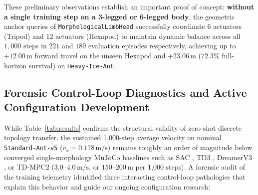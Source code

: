 \documentclass[11pt,a4paper]{article}
\begin{document}
These preliminary observations establish an important proof of concept: \textbf{without a single training step on a 3-legged or 6-legged body}, the geometric anchor queries of \texttt{MorphologicalLimbHead} successfully coordinate $6$ actuators (Tripod) and $12$ actuators (Hexapod) to maintain dynamic balance across all $1,000$ steps in $221$ and $189$ evaluation episodes respectively, achieving up to $+12.00\,\text{m}$ forward travel on the unseen Hexapod and $+23.06\,\text{m}$ ($72.3\%$ full-horizon survival) on \texttt{Heavy-Ice-Ant}.

\subsection{Forensic Control-Loop Diagnostics and Active Configuration Development}
While Table~\ref{tab:results} confirms the structural validity of zero-shot discrete topology transfer, the sustained 1,000-step average velocity on nominal \texttt{Standard-Ant-v5} ($\bar{v}_x = 0.178\,\text{m/s}$) remains roughly an order of magnitude below converged single-morphology MuJoCo baselines such as SAC \cite{haarnoja2018soft}, TD3 \cite{fujimoto2018addressing}, DreamerV3 \cite{hafner2023mastering}, or TD-MPC2 \cite{hansen2024tdmpc2} ($3.0\text{--}4.0\,\text{m/s}$, or $150\text{--}200\,\text{m}$ per 1,000 steps). A forensic audit of the training telemetry identified three interacting control-loop pathologies that explain this behavior and guide our ongoing configuration research:
\end{document}
